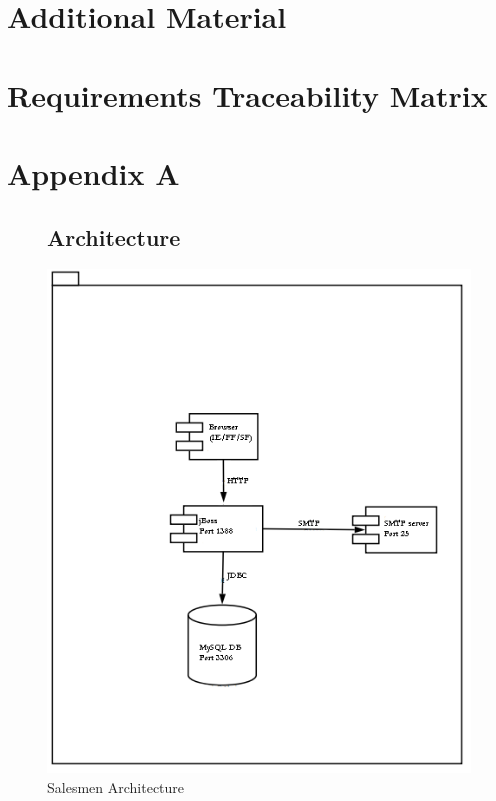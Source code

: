 \documentclass[a4paper, 12pt]{report}
\begin{document}
\chapter{Additional Material \label{Additional}}
\chapter{Requirements Traceability Matrix}

\chapter{Appendix A}


\begin{figure}
\section{Architecture}
\label{fig_architecture}
\includegraphics[scale=0.8]{../../img/archi1.png}
\caption{Salesmen Architecture}
\end{figure}
\end{document}
